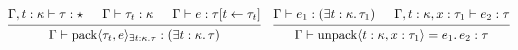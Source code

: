 \documentclass[lualatex,12pt,unicode]{article}
\begin{document}
\[
    \begin{prooftree}
        \hypo{\Gamma, t: \kappa \vdash \tau: \star}
        \hypo{\Gamma \vdash \tau_t: \kappa}
        \hypo{\Gamma \vdash e: \tau[t \leftarrow \tau_t]}
        \infer3{\Gamma \vdash \mathrm{pack}\langle \tau_t, e\rangle_{\exists t: \kappa\ldotp \tau}: (\exists t: \kappa\ldotp \tau)}
    \end{prooftree}
    \hspace{1em}
    \begin{prooftree}
        \hypo{\Gamma \vdash e_1: (\exists t: \kappa\ldotp \tau_1)}
        \hypo{\Gamma, t: \kappa, x: \tau_1 \vdash e_2: \tau}
        \infer2{\Gamma \vdash \mathrm{unpack}\langle t: \kappa, x: \tau_1\rangle = e_1\ldotp e_2: \tau}
    \end{prooftree}
\]
\end{document}
